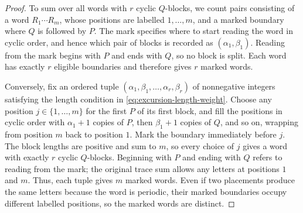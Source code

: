 \documentclass[11pt]{article}
\numberwithin{equation}{section}
\begin{document}
\begin{proof}
  To sum over all words with $r$ cyclic $Q$-blocks, we count pairs consisting
  of a word $R_1\cdots R_m$, whose positions are labelled $1,\ldots,m$, and
  a marked boundary where $Q$ is followed by $P$.
  The mark specifies where to start reading the word in cyclic order, and
  hence which pair of blocks is recorded as $(\alpha_1,\beta_1)$.
  Reading from the mark begins with $P$ and ends with $Q$, so no block is
  split. Each word has exactly $r$ eligible boundaries and therefore gives
  $r$ marked words.

  Conversely, fix an ordered tuple
  $(\alpha_1,\beta_1,\ldots,\alpha_r,\beta_r)$ of nonnegative integers
  satisfying the length condition in \eqref{eq:excursion-length-weight}.
  Choose any position $j\in\{1,\ldots,m\}$ for the first $P$ of its first
  block, and fill the positions in cyclic order with $\alpha_1+1$ copies
  of $P$, then $\beta_1+1$ copies of $Q$, and so on, wrapping from position
  $m$ back to position $1$. Mark the boundary immediately before $j$.
  The block lengths are positive and sum to $m$, so every choice of $j$
  gives a word with exactly $r$ cyclic $Q$-blocks.
  Beginning with $P$ and ending with $Q$ refers to reading from the mark;
  the original trace sum allows any letters at positions $1$ and $m$.
  Thus, each tuple gives $m$ marked words. Even if two placements produce
  the same letters because the word is periodic, their marked boundaries
  occupy different labelled positions, so the marked words are distinct.


\end{proof}
\end{document}
